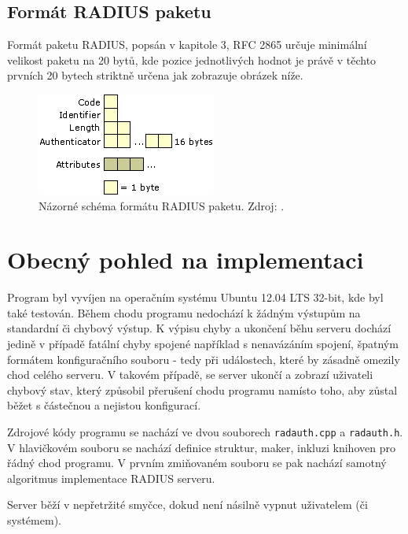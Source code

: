 \documentclass[12pt,a4paper,titlepage,final]{article}
\begin{document}
\subsection*{Formát RADIUS paketu}\label{paket_format}
Formát paketu RADIUS, popsán v kapitole 3, RFC 2865 určuje minimální velikost paketu na 20 bytů, kde pozice jednotlivých hodnot je právě v těchto prvních 20 bytech striktně určena jak zobrazuje obrázek níže.   
\begin{figure}[!h]
  \centering
  \includegraphics{RADIUS_packet.png}
  \caption{Názorné schéma formátu RADIUS paketu. Zdroj: \cite{paket}.}
\end{figure}



\section{Obecný pohled na implementaci}  \label{obecne}
Program byl vyvíjen na operačním systému Ubuntu 12.04 LTS 32-bit, kde byl také testován. Během chodu programu nedochází k žádným výstupům na standardní či chybový výstup. K výpisu chyby a ukončení běhu serveru dochází jedině v případě fatální chyby spojené například s nenavázáním spojení, špatným formátem konfiguračního souboru - tedy při událostech, které by zásadně omezily chod celého serveru. V takovém případě, se server ukončí a zobrazí uživateli chybový stav, který způsobil přerušení chodu programu namísto toho, aby zůstal běžet s částečnou a nejistou konfigurací.

Zdrojové kódy programu se nachází ve dvou souborech \texttt{radauth.cpp} a \texttt{radauth.h}. V hlavičkovém souboru se nachází definice struktur, maker, inkluzi knihoven pro řádný chod programu. V prvním zmiňovaném souboru se pak nachází samotný algoritmus implementace RADIUS serveru.

Server běží v nepřetržité smyčce, dokud není násilně vypnut uživatelem (či systémem).
\end{document}
